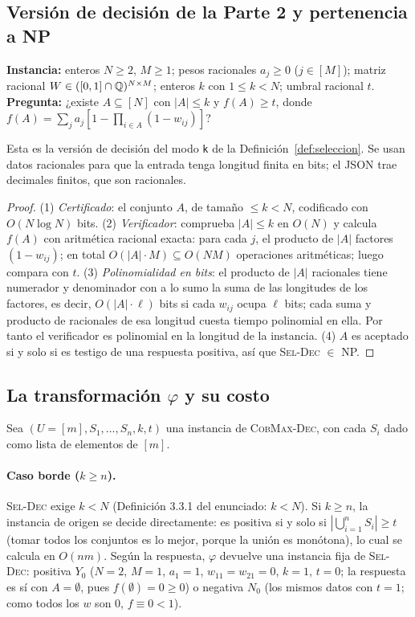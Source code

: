 \subsection{Versión de decisión de la Parte 2 y pertenencia a NP}

\begin{definicion}\label{def:seldec}
\textbf{Instancia:} enteros $N\ge 2$, $M\ge1$; pesos racionales $a_j\ge0$ ($j\in[M]$); matriz racional $W\in([0,1]\cap\mathbb{Q})^{N\times M}$; enteros $k$ con $1\le k<N$; umbral racional $t$. \textbf{Pregunta:} ¿existe $A\subseteq[N]$ con $|A|\le k$ y $f(A)\ge t$, donde $f(A)=\sum_{j}a_j[1-\prod_{i\in A}(1-w_{ij})]$?
\end{definicion}
Esta es la versión de decisión del modo \texttt{k} de la Definición~\ref{def:seleccion}. Se usan datos racionales para que la entrada tenga longitud finita en bits; el JSON trae decimales finitos, que son racionales.

\begin{proposicion}\label{prop:np}
\end{proposicion}
\begin{proof}
(1) \emph{Certificado}: el conjunto $A$, de tamaño $\le k<N$, codificado con $O(N\log N)$ bits.
(2) \emph{Verificador}: comprueba $|A|\le k$ en $O(N)$ y calcula $f(A)$ con aritmética racional exacta: para cada $j$, el producto de $|A|$ factores $(1-w_{ij})$; en total $O(|A|\cdot M)\subseteq O(NM)$ operaciones aritméticas; luego compara con $t$.
(3) \emph{Polinomialidad en bits}: el producto de $|A|$ racionales tiene numerador y denominador con a lo sumo la suma de las longitudes de los factores, es decir, $O(|A|\cdot\ell)$ bits si cada $w_{ij}$ ocupa $\ell$ bits; cada suma y producto de racionales de esa longitud cuesta tiempo polinomial en ella. Por tanto el verificador es polinomial en la longitud de la instancia.
(4) $A$ es aceptado si y solo si es testigo de una respuesta positiva, así que \textsc{Sel-Dec} $\in$ NP.
\end{proof}

\subsection{La transformación $\varphi$ y su costo}

Sea $(U=[m],S_1,\dots,S_n,k,t)$ una instancia de \textsc{CobMax-Dec}, con cada $S_i$ dado como lista de elementos de $[m]$.

\paragraph{Caso borde ($k\ge n$).} \textsc{Sel-Dec} exige $k<N$ (Definición 3.3.1 del enunciado: $k<N$). Si $k\ge n$, la instancia de origen se decide directamente: es positiva si y solo si $|\bigcup_{i=1}^{n}S_i|\ge t$ (tomar todos los conjuntos es lo mejor, porque la unión es monótona), lo cual se calcula en $O(nm)$. Según la respuesta, $\varphi$ devuelve una instancia fija de \textsc{Sel-Dec}: positiva $Y_0$ ($N=2$, $M=1$, $a_1=1$, $w_{11}=w_{21}=0$, $k=1$, $t=0$; la respuesta es sí con $A=\emptyset$, pues $f(\emptyset)=0\ge 0$) o negativa $N_0$ (los mismos datos con $t=1$; como todos los $w$ son $0$, $f\equiv 0<1$).

